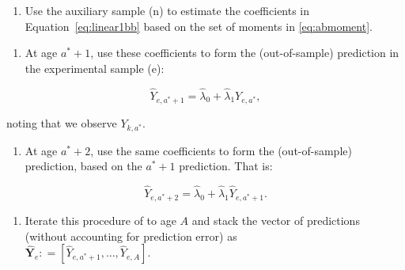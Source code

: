 \documentclass[static]{JJH-Beamer}
\begin{document}
\begin{frame}

\begin{enumerate}[1.]
\item Use the auxiliary sample (n) to estimate the coefficients in Equation~\eqref{eq:linear1bb} based on the set of moments in \eqref{eq:abmoment}.
\end{enumerate}

\end{frame}

\begin{frame}

\begin{enumerate}[2.]
\item At age $a^*+1$, use these coefficients to form the (out-of-sample) prediction in the experimental sample (e):
\end{enumerate}

\begin{equation}
\hat{Y}_{e,a^* + 1} = \hat{\lambda}_{0} + \hat{\lambda}_{1} Y_{e,a^*},
\end{equation}

\noindent noting that we observe $Y_{k,a^*}$.

\end{frame}

\begin{frame}

\begin{enumerate}[3.]
\item At age $a^*+2$, use the same coefficients to form the (out-of-sample) prediction, based on the $a^*+1$ prediction. That is:
\end{enumerate}

\begin{equation}
\hat{Y}_{e,a^* + 2} = \hat{\lambda}_{0} + \hat{\lambda}_{1} \hat{Y}_{e,a^*+1}.
\end{equation}

\end{frame}

\begin{frame}

\begin{enumerate}[4.]
\item Iterate this procedure of to age $A$ and stack the vector of predictions (without accounting for prediction error) as \\ $\hat{\bm{Y}}_{e} : = \left[ \hat{Y}_{e,a^*+1}, \ldots,  \hat{Y}_{e,A} \right]$.
\end{enumerate}

\end{frame}
\end{document}
